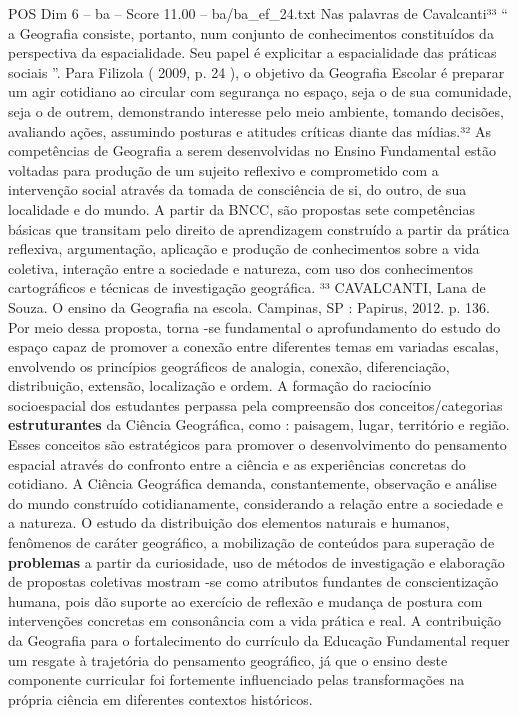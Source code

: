\begin{textsample}{POS Dim 6 – ba – Score 11.00 – ba/ba\_ef\_24.txt}
Nas palavras de Cavalcanti³³ “ a Geografia consiste, portanto, num conjunto de conhecimentos constituídos da perspectiva da espacialidade.
Seu papel é explicitar a espacialidade das práticas sociais ”.
Para Filizola ( 2009, p. 24 ), o objetivo da Geografia Escolar é preparar um agir cotidiano ao circular com segurança no espaço, seja o de sua comunidade, seja o de outrem, demonstrando interesse pelo meio ambiente, tomando decisões, avaliando ações, assumindo posturas e atitudes críticas diante das mídias.³² As competências de Geografia a serem desenvolvidas no Ensino Fundamental estão voltadas para produção de um sujeito reflexivo e comprometido com a intervenção social através da tomada de consciência de si, do outro, de sua localidade e do mundo.
A partir da BNCC, são propostas sete competências básicas que transitam pelo direito de aprendizagem construído a partir da prática reflexiva, argumentação, aplicação e produção de conhecimentos sobre a vida coletiva, interação entre a sociedade e natureza, com uso dos conhecimentos cartográficos e técnicas de investigação geográfica. ³³ CAVALCANTI, Lana de Souza.
O ensino da Geografia na escola.
Campinas, SP : Papirus, 2012. p. 136.
Por meio dessa proposta, torna -se fundamental o aprofundamento do estudo do espaço capaz de promover a conexão entre diferentes temas em variadas escalas, envolvendo os princípios geográficos de analogia, conexão, diferenciação, distribuição, extensão, localização e ordem.
A formação do raciocínio socioespacial dos estudantes perpassa pela compreensão dos conceitos/categorias \textbf{estruturantes} da Ciência Geográfica, como : paisagem, lugar, território e região.
Esses conceitos são estratégicos para promover o desenvolvimento do pensamento espacial através do confronto entre a ciência e as experiências concretas do cotidiano.
A Ciência Geográfica demanda, constantemente, observação e análise do mundo construído cotidianamente, considerando a relação entre a sociedade e a natureza.
O estudo da distribuição dos elementos naturais e humanos, fenômenos de caráter geográfico, a mobilização de conteúdos para superação de \textbf{problemas} a partir da curiosidade, uso de métodos de investigação e elaboração de propostas coletivas mostram -se como atributos fundantes de conscientização humana, pois dão suporte ao exercício de reflexão e mudança de postura com intervenções concretas em consonância com a vida prática e real.
A contribuição da Geografia para o fortalecimento do currículo da Educação Fundamental requer um resgate à trajetória do pensamento geográfico, já que o ensino deste componente curricular foi fortemente influenciado pelas transformações na própria ciência em diferentes contextos históricos.

\end{textsample}
